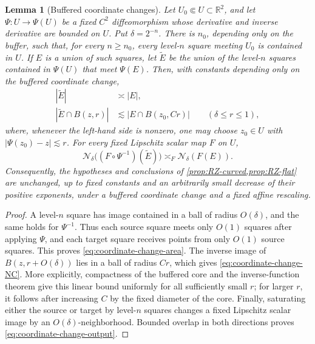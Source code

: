 \documentclass[11pt]{article}
\newtheorem{lemma}[theorem]{Lemma}
\begin{document}
\begin{lemma}[Buffered coordinate changes]
\label{lem:buffered-coordinate-change}
Let \(U_0\Subset U\subset\mathbb R^2\), and let
\(\Psi:U\to\Psi(U)\) be a fixed \(C^2\) diffeomorphism whose
derivative and inverse derivative are bounded on \(U\).  Put
\(\delta=2^{-n}\).  There is \(n_0\), depending only on the buffer,
such that, for every \(n\ge n_0\), every level-\(n\) square meeting
\(U_0\) is contained in \(U\).  If \(E\) is a union of such squares,
let \(\widetilde E\) be the union of the level-\(n\) squares contained
in \(\Psi(U)\) that meet \(\Psi(E)\).  Then, with constants depending
only on the buffered coordinate change,
\begin{align}
 |\widetilde E|&\asymp |E|,\label{eq:coordinate-change-area}\\
 |\widetilde E\cap B(z,r)|
 &\lesssim |E\cap B(z_0,Cr)|
 \qquad(\delta\le r\le1),
 \label{eq:coordinate-change-NC}
\end{align}
where, whenever the left-hand side is nonzero, one may choose
\(z_0\in U\) with \(|\Psi(z_0)-z|\lesssim r\).
For every fixed Lipschitz scalar map \(F\) on \(U\),
\begin{equation}
 \mathcal N_\delta\bigl((F\circ\Psi^{-1})(\widetilde E)\bigr)
 \asymp_F \mathcal N_\delta(F(E)).
 \label{eq:coordinate-change-output}
\end{equation}
Consequently, the hypotheses and conclusions of
\cref{prop:RZ-curved,prop:RZ-flat} are unchanged, up to fixed
constants and an arbitrarily small decrease of their positive
exponents, under a buffered coordinate change and a fixed affine
rescaling.
\end{lemma}

\begin{proof}
A level-\(n\) square has image contained in a ball of radius
\(O(\delta)\), and the same holds for \(\Psi^{-1}\).  Thus each source
square meets only \(O(1)\) squares after applying \(\Psi\), and each
target square receives points from only \(O(1)\) source squares.
This proves \eqref{eq:coordinate-change-area}.  The inverse image of
\(B(z,r+O(\delta))\) lies in a ball of radius \(Cr\), which gives
\eqref{eq:coordinate-change-NC}.  More explicitly, compactness of the
buffered core and the inverse-function theorem give this linear bound
uniformly for all sufficiently small \(r\); for larger \(r\), it
follows after increasing \(C\) by the fixed diameter of the core.
Finally, saturating either the
source or target by level-\(n\) squares changes a fixed Lipschitz
scalar image by an \(O(\delta)\)-neighborhood.  Bounded overlap in
both directions proves \eqref{eq:coordinate-change-output}.
\end{proof}
\end{document}
